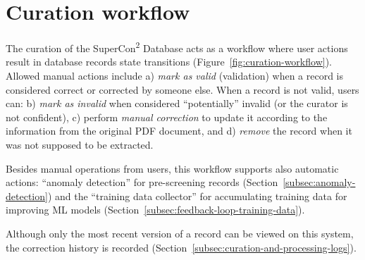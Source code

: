 \documentclass[]{interact}
\theoremstyle{plain} %
\theoremstyle{definition}
\theoremstyle{remark}
\begin{document}

\section{Curation workflow}
\label{sec:curation-workflow}
The curation of the SuperCon\textsuperscript{2} Database acts as a workflow where user actions result in database records state transitions (Figure~\ref{fig:curation-workflow}). 
Allowed manual actions include a) \textit{mark as valid} (validation) when a record is considered correct or corrected by someone else. When a record is not valid, users can: b) \textit{mark as invalid} when considered ``potentially'' invalid (or the curator is not confident), c) perform \textit{manual correction} to update it according to the information from the original PDF document, and d) \textit{remove} the record when it was not supposed to be extracted.

Besides manual operations from users, this workflow supports also automatic actions: ``anomaly detection'' for pre-screening records (Section~\ref{subsec:anomaly-detection}) and the ``training data collector'' for accumulating training data for improving ML models (Section~\ref{subsec:feedback-loop-training-data}). 


Although only the most recent version of a record can be viewed on this system, the correction history is recorded (Section~\ref{subsec:curation-and-processing-logs}). 
\end{document}
